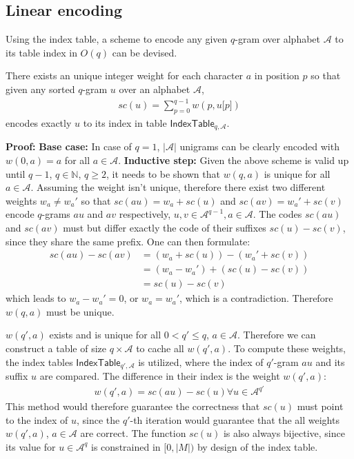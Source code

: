\documentclass[twoside,a4paper,bsc]{master}
\newcommand{\Qgram}[1]{\(#1\)-gram}
\newcommand{\IT}[2]{\mathsf{IndexTable}_{#1,#2}}
\newcommand{\Subchar}[2]{#1\lbrack #2\rbrack}
\newcommand{\Alpha}[0]{\mathcal{A}}
\newcommand{\Nats}{\mathbb{N}}
\newcommand{\Skiptheorem}{\smallskipamount}
\newcommand{\StartFormal}[1]{\par\addvspace{\Skiptheorem}\noindent\textbf{#1}}
\newcommand{\EndFormal}{\par\addvspace{\Skiptheorem}}
\newenvironment{Proof}{\StartFormal{Proof:}}{\EndFormal}
\begin{document}
\subsection{Linear encoding}
Using the index table, a scheme to encode any given \Qgram{q} over
alphabet \(\Alpha\) to its table index in \(O(q)\) can be devised.
\begin{Lemma}
\label{lm:weightproof}
There exists an unique integer weight for each character \(a\) in position
\(p\) so that given any sorted \Qgram{q} \(u\) over an alphabet
\(\Alpha\),
\begin{align}
sc(u)=\sum_{p=0}^{q-1} w(p,\Subchar{u}{p})
\end{align}
encodes exactly \(u\) to its index in table \(\IT{q}{\Alpha}\).
\begin{Proof}
\textbf{Base case:} In case of \(q=1\), \(|\Alpha|\) unigrams can be
clearly encoded with \(w(0,a) = a\) for all \(a \in \Alpha\).
\textbf{Inductive step:} Given the above scheme is valid up until
\(q-1\), \(q\in \Nats\), \(q\geq 2\), it needs to be shown that
\(w(q,a)\) is unique for
all \(a\in \Alpha\). Assuming the weight isn't unique, therefore there
exist two different weights \(w_a\neq w_a'\) so that \(sc(au) = w_a + sc(u)\)
and \(sc(av) = w_a' + sc(v)\) encode \Qgram{q}s \(au\) and \(av\)
respectively, \(u,v\in \Alpha^{q-1},a\in\Alpha\). The codes \(sc(au)\) and
\(sc(av)\) must but differ exactly the code of their suffixes \(sc(u)-sc(v)\),
since they share the same prefix. One can then formulate:
\begin{align}
sc(au) - sc(av) &= (w_a + sc(u)) - (w_a' + sc(v))\\
&= (w_a - w_a') + (sc(u) - sc(v))\\
&= sc(u) - sc(v)
\end{align}
which leads to \(w_a - w_a' = 0\), or \(w_a = w_a'\), which is a
contradiction. Therefore \(w(q,a)\) must be unique.
\end{Proof}
\end{Lemma}

\(w(q',a)\) exists and is unique for all \(0 < q' \leq q\), \(a\in \Alpha\). 
Therefore we can construct a table of size \(q\times \Alpha\) to cache all 
\(w(q',a)\). To compute these weights, the index tables \(\IT{q'}{\Alpha}\) 
is utilized, where the index of \Qgram{q'} \(au\) and its suffix \(u\) are 
compared. The difference in their index is the weight \(w(q',a)\):
\begin{align}
w(q',a) = sc(au) - sc(u) \forall u\in \Alpha^{q'}
\label{eq:weightcalc}
\end{align}
This method 
would therefore guarantee the correctness that \(sc(u)\) must point to the 
index of \(u\), since the \(q'\)-th iteration would guarantee that the all 
weights \(w(q',a)\), \(a\in\Alpha\) are correct. The function \(sc(u)\) is also 
always bijective, since its value for \(u\in \Alpha^q\) is constrained in 
\([0,|M|)\) by design of the index table.
\end{document}

